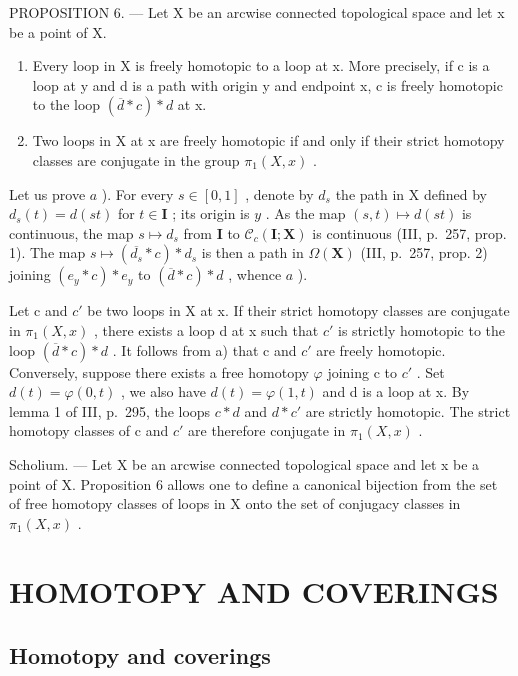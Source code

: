 PROPOSITION 6. --- Let X be an arcwise connected topological space and let x be a point of X.

\begin{enumerate}
\def\labelenumi{\alph{enumi})}
\item
  Every loop in X is freely homotopic to a loop at x. More precisely, if c is a loop at y and d is a path with origin y and endpoint x, c is freely homotopic to the loop \((\overline{d} * c) * d\) at x.
\item
  Two loops in X at x are freely homotopic if and only if their strict homotopy classes are conjugate in the group \(\pi_{1}(X,x)\) .
\end{enumerate}

Let us prove \(a\) ). For every \(s \in [0,1]\) , denote by \(d_s\) the path in X defined by \(d_s(t) = d(st)\) for \(t \in \mathbf{I}\) ; its origin is \(y\) . As the map \((s,t) \mapsto d(st)\) is continuous, the map \(s \mapsto d_s\) from \(\mathbf{I}\) to \(\mathcal{C}_c(\mathbf{I};\mathbf{X})\) is continuous (III, p.~257, prop. 1). The map \(s \mapsto (\overline{d_s} * c) * d_s\) is then a path in \(\Omega(\mathbf{X})\) (III, p.~257, prop. 2) joining \((e_y * c) * e_y\) to \((\overline{d} * c) * d\) , whence \(a\) ).

Let c and \(c'\) be two loops in X at x. If their strict homotopy classes are conjugate in \(\pi_{1}(X,x)\) , there exists a loop d at x such that \(c'\) is strictly homotopic to the loop \((\overline{d} * c) * d\) . It follows from a) that c and \(c'\) are freely homotopic. Conversely, suppose there exists a free homotopy \(\varphi\) joining c to \(c'\) . Set \(d(t) = \varphi(0,t)\) , we also have \(d(t) = \varphi(1,t)\) and d is a loop at x. By lemma 1 of III, p.~295, the loops \(c * d\) and \(d * c'\) are strictly homotopic. The strict homotopy classes of c and \(c'\) are therefore conjugate in \(\pi_{1}(X,x)\) .

Scholium. --- Let X be an arcwise connected topological space and let x be a point of X. Proposition 6 allows one to define a canonical bijection from the set of free homotopy classes of loops in X onto the set of conjugacy classes in \(\pi_{1}(X,x)\) .

\section{HOMOTOPY AND COVERINGS}

\subsection{Homotopy and coverings}

